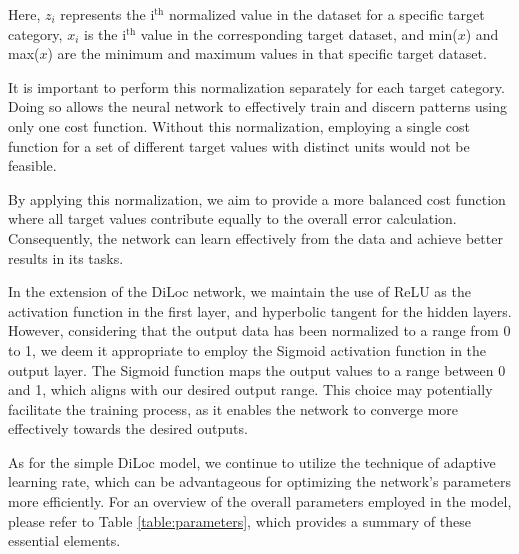\documentclass[a4paper, UKenglish, 11pt]{uiomaster}
\begin{document}
Here, $z_i$ represents the i$^{\text{th}}$ normalized value in the dataset for a specific target category, $x_i$ is the i$^{\text{th}}$ value in the corresponding target dataset, and min($x$) and max($x$) are the minimum and maximum values in that specific target dataset.

It is important to perform this normalization separately for each target category. Doing so allows the neural network to effectively train and discern patterns using only one cost function. Without this normalization, employing a single cost function for a set of different target values with distinct units would not be feasible.

By applying this normalization, we aim to provide a more balanced cost function where all target values contribute equally to the overall error calculation. Consequently, the network can learn effectively from the data and achieve better results in its tasks.

In the extension of the DiLoc network, we maintain the use of ReLU as the activation function in the first layer, and hyperbolic tangent for the hidden layers. However, considering that the output data has been normalized to a range from 0 to 1, we deem it appropriate to employ the Sigmoid activation function in the output layer. The Sigmoid function maps the output values to a range between 0 and 1, which aligns with our desired output range. This choice may potentially facilitate the training process, as it enables the network to converge more effectively towards the desired outputs. %

As for the simple DiLoc model, we continue to utilize the technique of adaptive learning rate, which can be advantageous for optimizing the network's parameters more efficiently. For an overview of the overall parameters employed in the model, please refer to Table \ref{table:parameters}, which provides a summary of these essential elements.
\end{document}
